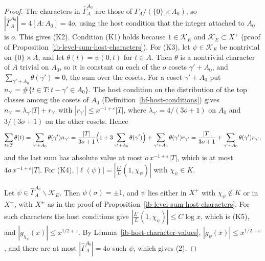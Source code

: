 \begin{proof}
The characters in $\widehat\Gamma_A^{A_0}$ are those of $\Gamma_A/(\{0\}\times A_0)$, so
$|\widehat\Gamma_A^{A_0}|=4[A:A_0]=4o$, using the host condition that the integer attached to
$A_0$ is $o$. This gives (K2). Condition (K1) holds because $1\in\mathcal K_E$ and
$\mathcal K_E\subset X^+$ (proof of
Proposition~\ref{ib-level-sum-host-characters}). For (K3), let
$\psi\in\mathcal K_E$ be nontrivial on $\{0\}\times A$, and let $\theta(t)=\psi(0,t)$
for $t\in A$. Then $\theta$ is a nontrivial character of $A$ trivial on $A_0$, so
it is constant on each of the $o$ cosets $\gamma'+A_0$, and
$\sum_{\gamma'+A_0}\theta(\gamma')=0$, the sum over the cosets. For a coset
$\gamma'+A_0$ put $n_{\gamma'}=\#\{t\in T:t-\gamma'\in A_0\}$. The host condition on the
distribution of the top classes among the cosets of $A_0$
(Definition~\ref{hf-host-conditions}) gives
$n_{\gamma'}=\lambda_{\gamma'}|T|+r_{\gamma'}$ with $|r_{\gamma'}|\leq x^{-1+\varepsilon}|T|$,
where $\lambda_{\gamma'}=4/(3o+1)$ on $A_0$ and $3/(3o+1)$ on the other cosets.
Hence
\[
 \sum_{t\in T}\theta(t)=\sum_{\gamma'+A_0}\theta(\gamma')n_{\gamma'}
 =\frac{|T|}{3o+1}\Bigl(1+3\sum_{\gamma'+A_0}\theta(\gamma')\Bigr)
 +\sum_{\gamma'+A_0}\theta(\gamma')r_{\gamma'}
 =\frac{|T|}{3o+1}+\sum_{\gamma'+A_0}\theta(\gamma')r_{\gamma'},
\]
and the last sum has absolute value at most $o\,x^{-1+\varepsilon}|T|$, which is at
most $4o\,x^{-1+\varepsilon}|T|$. For (K4),
$|\ell(\psi)|=|\frac{L'}{L}(1,\chi_\psi)|$ with $\chi_\psi\in K$.

Let $\psi\in\widehat\Gamma_A^{A_0}\smallsetminus\mathcal K_E$. Then $\psi(\sigma)=\pm1$, and
$\psi$ lies either in $X^+$ with $\chi_\psi\notin K$ or in $X^-$, with $X^\pm$ as
in the proof of Proposition~\ref{ib-level-sum-host-characters}. For such
characters the host conditions give $|\frac{L'}{L}(1,\chi_\psi)|\leq C\log x$,
which is (K5), and $|g_{\chi_\psi}(x)|\leq x^{1/2+\varepsilon}$. By
Lemma~\ref{ib-host-character-values}, $|g_\psi(x)|\leq x^{1/2+\varepsilon}$, and
there are at most $|\widehat\Gamma_A^{A_0}|=4o$ such $\psi$, which gives (2).
\end{proof}

